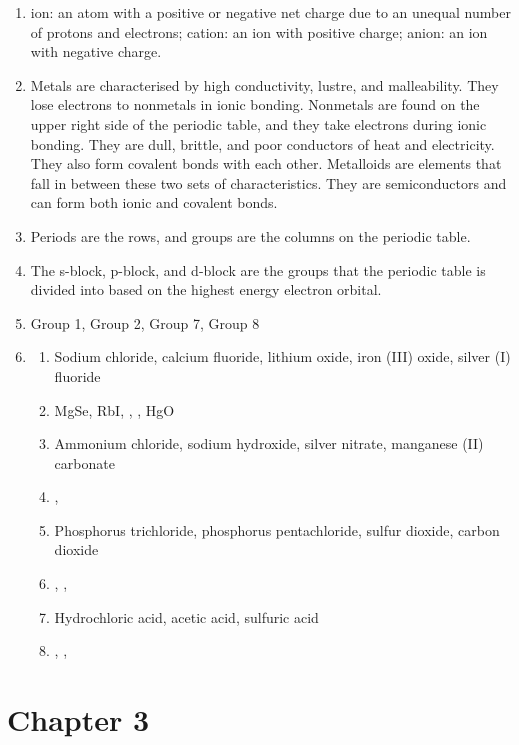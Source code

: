 \documentclass[a4paper, 12pt]{article}
\begin{document}
\begin{enumerate}[label=\alph*.]
\item ion: an atom with a positive or negative net charge due to an unequal number of protons and electrons; cation: an ion with positive charge; anion: an ion with negative charge.
\item Metals are characterised by high conductivity, lustre, and malleability. They lose electrons to nonmetals in ionic bonding. Nonmetals are found on the upper right side of the periodic table, and they take electrons during ionic bonding. They are dull, brittle, and poor conductors of heat and electricity. They also form covalent bonds with each other. Metalloids are elements that fall in between these two sets of characteristics. They are semiconductors and can form both ionic and covalent bonds.
\item Periods are the rows, and groups are the columns on the periodic table.
\item The s-block, p-block, and d-block are the groups that the periodic table is divided into based on the highest energy electron orbital.
\item Group 1, Group 2, Group 7, Group 8
\item \begin{enumerate}[label=\roman*.]
\item Sodium chloride, calcium fluoride, lithium oxide, iron (III) oxide, silver (I) fluoride
\item MgSe, RbI, , , HgO
\item Ammonium chloride, sodium hydroxide, silver nitrate, manganese (II) carbonate
\item {}, 
\item Phosphorus trichloride, phosphorus pentachloride, sulfur dioxide, carbon dioxide
\item {}, , 
\item Hydrochloric acid, acetic acid, sulfuric acid
\item {}, , 
\end{enumerate}
\end{enumerate}

\section{Chapter 3}
\end{document}
